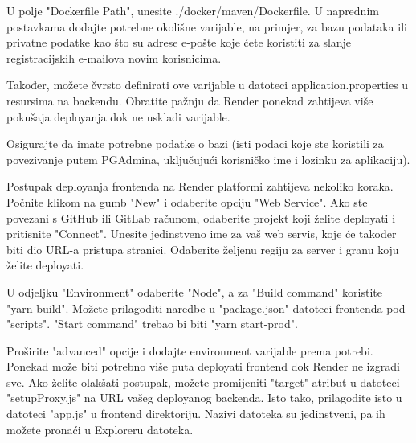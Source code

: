 U polje "Dockerfile Path", unesite ./docker/maven/Dockerfile. U naprednim postavkama dodajte potrebne okolišne varijable, na primjer, za bazu podataka ili privatne podatke kao što su adrese e-pošte koje ćete koristiti za slanje registracijskih e-mailova novim korisnicima.

Također, možete čvrsto definirati ove varijable u datoteci application.properties u resursima na backendu. Obratite pažnju da Render ponekad zahtijeva više pokušaja deployanja dok ne uskladi varijable.

Osigurajte da imate potrebne podatke o bazi (isti podaci koje ste koristili za povezivanje putem PGAdmina, uključujući korisničko ime i lozinku za aplikaciju).

Postupak deployanja frontenda na Render platformi zahtijeva nekoliko koraka. Počnite klikom na gumb "New" i odaberite opciju "Web Service". Ako ste povezani s GitHub ili GitLab računom, odaberite projekt koji želite deployati i pritisnite "Connect". Unesite jedinstveno ime za vaš web servis, koje će također biti dio URL-a pristupa stranici. Odaberite željenu regiju za server i granu koju želite deployati.

 U odjeljku "Environment" odaberite "Node", a za "Build command" koristite "yarn build". Možete prilagoditi naredbe u "package.json" datoteci frontenda pod "scripts". "Start command" trebao bi biti "yarn start-prod".

Proširite "advanced" opcije i dodajte environment varijable prema potrebi. Ponekad može biti potrebno više puta deployati frontend dok Render ne izgradi sve. Ako želite olakšati postupak, možete promijeniti "target" atribut u datoteci "setupProxy.js" na URL vašeg deployanog backenda. Isto tako, prilagodite isto u datoteci "app.js" u frontend direktoriju. Nazivi datoteka su jedinstveni, pa ih možete pronaći u Exploreru datoteka.

\eject 